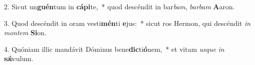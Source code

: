 2. Sicut un\textbf{guén}tum in \textbf{cá}\textbf{pi}te,~*  quod descéndit in bar\textit{bam}, \textit{bar}\textit{bam} \textbf{A}aron.\

3. Quod descéndit in oram vesti\textbf{mén}ti \textbf{e}jus:~*  sicut ros Hermon, qui descéndit \textit{in} \textit{mon}\textit{tem} \textbf{Si}on.\

4. Quóniam illic mandávit Dóminus bene\textbf{dic}ti\textbf{ó}nem,~*  et vitam \textit{us}\textit{que} \textit{in} \textbf{sǽ}culum.\

